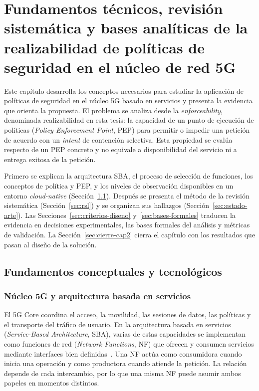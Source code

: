 \chapter{Fundamentos técnicos, revisión sistemática y bases analíticas de la realizabilidad de políticas de seguridad en el núcleo de red 5G}
\label{cap:fundamento-revision}

Este capítulo desarrolla los conceptos necesarios para estudiar la aplicación de políticas de seguridad en el núcleo 5G basado en servicios y presenta la evidencia que orienta la propuesta. El problema se analiza desde la \textit{enforceability}, denominada realizabilidad en esta tesis: la capacidad de un punto de ejecución de políticas (\textit{Policy Enforcement Point}, PEP) para permitir o impedir una petición de acuerdo con un \textit{intent} de contención selectiva. Esta propiedad se evalúa respecto de un PEP concreto y no equivale a disponibilidad del servicio ni a entrega exitosa de la petición.

Primero se explican la arquitectura SBA, el proceso de selección de funciones, los conceptos de política y PEP, y los niveles de observación disponibles en un entorno \textit{cloud-native} (Sección~\ref{sec:fundamentos}). Después se presenta el método de la revisión sistemática (Sección~\ref{sec:rsl}) y se organizan sus hallazgos (Sección~\ref{sec:estado-arte}). Las Secciones~\ref{sec:criterios-diseno} y~\ref{sec:bases-formales} traducen la evidencia en decisiones experimentales, las bases formales del análisis y métricas de validación. La Sección~\ref{sec:cierre-cap2} cierra el capítulo con los resultados que pasan al diseño de la solución.

\section{Fundamentos conceptuales y tecnológicos}
\label{sec:fundamentos}

\subsection{Núcleo 5G y arquitectura basada en servicios}
\label{subsec:fundamentos-sba}

El 5G Core coordina el acceso, la movilidad, las sesiones de datos, las políticas y el transporte del tráfico de usuario. En la arquitectura basada en servicios (\textit{Service-Based Architecture}, SBA), varias de estas capacidades se implementan como funciones de red (\textit{Network Functions}, NF) que ofrecen y consumen servicios mediante interfaces bien definidas~\cite{ETSI_TS_123501_R16,ETSI_TS_129500_R16}. Una NF actúa como consumidora cuando inicia una operación y como productora cuando atiende la petición. La relación depende de cada intercambio, por lo que una misma NF puede asumir ambos papeles en momentos distintos.

